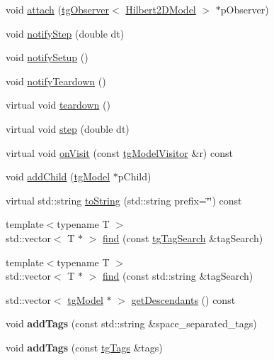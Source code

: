 \begin{DoxyCompactItemize}
\item 
void \hyperlink{classtg_subject_a56ecfd33a048c3a7f1a884318d9af548}{attach} (\hyperlink{classtg_observer}{tg\-Observer}$<$ \hyperlink{class_hilbert2_d_model}{Hilbert2\-D\-Model} $>$ $\ast$p\-Observer)
\item 
void \hyperlink{classtg_subject_ad9640aa7fcc1e0b4ce8a913a4ce1ea42}{notify\-Step} (double dt)
\item 
void \hyperlink{classtg_subject_a80799e5d0c8512d3d05a55764790392b}{notify\-Setup} ()
\item 
void \hyperlink{classtg_subject_adf7a60dbb0faf0de5528f862e7953e63}{notify\-Teardown} ()
\item 
virtual void \hyperlink{classtg_model_adb5eec1dcf70a8c039850aea144dcc7e}{teardown} ()
\item 
virtual void \hyperlink{classtg_model_acc6f9ae005f9f51447d7efe5f1815737}{step} (double dt)
\item 
virtual void \hyperlink{classtg_model_aee6457e0fc54d5570b87bfc779f9b1c0}{on\-Visit} (const \hyperlink{classtg_model_visitor}{tg\-Model\-Visitor} \&r) const 
\item 
void \hyperlink{classtg_model_a292c17848b96caee32b2286e44c13f2f}{add\-Child} (\hyperlink{classtg_model}{tg\-Model} $\ast$p\-Child)
\item 
virtual std\-::string \hyperlink{classtg_model_af37b0c1a6d4060bfe0bb9b5038a17725}{to\-String} (std\-::string prefix=\char`\"{}\char`\"{}) const 
\item 
{\footnotesize template$<$typename T $>$ }\\std\-::vector$<$ T $\ast$ $>$ \hyperlink{classtg_model_ab75836fdfbd9200f165c3b28a19630c0}{find} (const \hyperlink{classtg_tag_search}{tg\-Tag\-Search} \&tag\-Search)
\item 
{\footnotesize template$<$typename T $>$ }\\std\-::vector$<$ T $\ast$ $>$ \hyperlink{classtg_model_aa40b5fb32f8941e04d537f4e6c6db35c}{find} (const std\-::string \&tag\-Search)
\item 
std\-::vector$<$ \hyperlink{classtg_model}{tg\-Model} $\ast$ $>$ \hyperlink{classtg_model_a2efa4321fa5c77b4ce23b01f6fd3a1c4}{get\-Descendants} () const 
\item 
\hypertarget{classtg_taggable_af0b8f1729653b0b90d2fecbd51163612}{void {\bfseries add\-Tags} (const std\-::string \&space\-\_\-separated\-\_\-tags)}\label{classtg_taggable_af0b8f1729653b0b90d2fecbd51163612}

\item 
\hypertarget{classtg_taggable_af28e3fe1a7e4eb28772dc006d575dd1f}{void {\bfseries add\-Tags} (const \hyperlink{classtg_tags}{tg\-Tags} \&tags)}\label{classtg_taggable_af28e3fe1a7e4eb28772dc006d575dd1f}


\end{DoxyCompactItemize}
